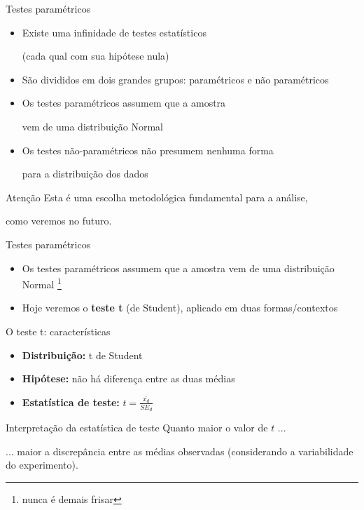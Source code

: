 \documentclass{beamer}
\begin{document}
\begin{frame}{\scriptsize Testes paramétricos}
  \begin{itemize}
    \scriptsize
  \item Existe uma infinidade de testes estatísticos

    {\tiny (cada qual com sua hipótese nula)}
  \item São divididos em dois grandes grupos: paramétricos e não paramétricos
    \bigskip
  \item Os testes paramétricos assumem que a amostra

    vem de uma \alert{distribuição Normal}
  \item Os testes não-paramétricos não presumem nenhuma forma

    para a distribuição dos dados
  \end{itemize}
  \bigskip
  \begin{block}{Atenção}
    \footnotesize
    Esta é uma escolha metodológica fundamental para a análise,

    como veremos no futuro.
  \end{block}
\end{frame}

\begin{frame}{\scriptsize Testes paramétricos}
  \begin{itemize}
    \footnotesize
  \item Os testes paramétricos assumem que a amostra vem de uma \alert{distribuição Normal} \footnote{\tiny nunca é demais frisar}
    \bigskip
  \item Hoje veremos o {\bf teste t} (de Student), aplicado em duas formas/contextos
  \end{itemize}
\end{frame}

\begin{frame}{\scriptsize O teste t: características}
  \begin{itemize}
    \footnotesize
  \item {\bf Distribuição:} t de Student
  \item {\bf Hipótese:} não há diferença entre as duas médias
  \item {\bf Estatística de teste:} $t = \frac{\bar{x_d}}{SE_d}$
  \end{itemize}
  \vfill
  \begin{block}{Interpretação da estatística de teste}
    \centering
    Quanto maior o valor de $t$ ...

    \bigskip
    ... maior a \alert{discrepância} entre as médias observadas
    ({\footnotesize considerando a variabilidade do experimento}).
  \end{block}
\end{frame}
\end{document}
